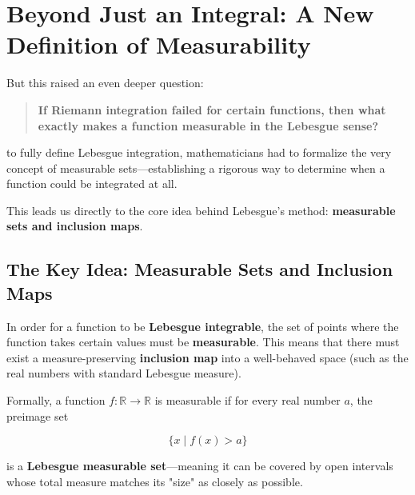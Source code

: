 \section{Beyond Just an Integral: A New Definition of Measurability}

But this raised an even deeper question:

\begin{quote}
\textbf{If Riemann integration failed for certain functions, then what exactly makes a function measurable in the Lebesgue sense?}
\end{quote}

 to fully define Lebesgue integration, mathematicians had to formalize the very concept of measurable sets—establishing a rigorous way to determine when a function could be integrated at all.

This leads us directly to the core idea behind Lebesgue’s method: \textbf{measurable sets and inclusion maps}.

\subsection{The Key Idea: Measurable Sets and Inclusion Maps}

In order for a function to be \textbf{Lebesgue integrable}, the set of points where the function takes certain values must be \textbf{measurable}. This means that there must exist a measure-preserving \textbf{inclusion map} into a well-behaved space (such as the real numbers with standard Lebesgue measure).

Formally, a function \( f: \mathbb{R} \to \mathbb{R} \) is measurable if for every real number \( a \), the preimage set

\[
\{ x \mid f(x) > a \}
\]

is a \textbf{Lebesgue measurable set}—meaning it can be covered by open intervals whose total measure matches its "size" as closely as possible.

